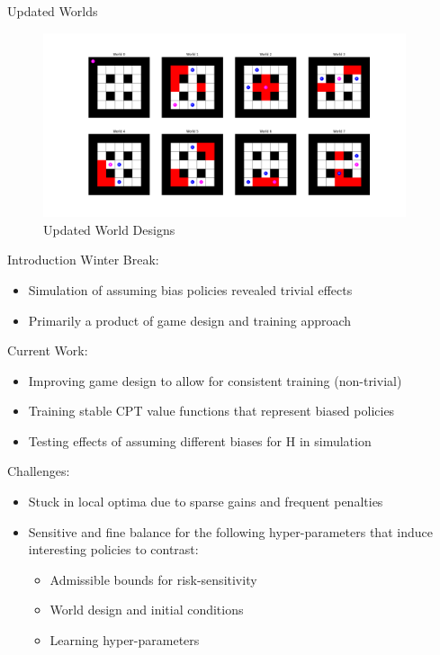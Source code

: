 \documentclass[aspectratio=1610, xcolor=dvipsnames]{packages/beamer}
\begin{document}
\begin{frame}{Updated Worlds}
    \begin{figure}
        \centering
        \includegraphics[width=0.95\textwidth]{../results/Fig_Worlds}
        \caption{Updated World Designs}
        \label{fig:Worlds}
    \end{figure}

\end{frame}
\begin{frame}{Introduction}
    Winter Break:
    \begin{itemize}
        \item Simulation of assuming bias policies revealed trivial effects
        \item Primarily a product of game design and training approach
    \end{itemize}
    Current Work:
    \begin{itemize}
        \item Improving game design to allow for consistent training (non-trivial)
        \item Training stable CPT value functions that represent biased policies
        \item Testing effects of assuming different biases for H in simulation
    \end{itemize}
    Challenges: \begin{itemize}
        \item Stuck in local optima due to sparse gains and frequent penalties
        \item Sensitive and fine balance for the following hyper-parameters that induce interesting policies to contrast:
        \begin{itemize}
            \item Admissible bounds for risk-sensitivity
            \item World design and initial conditions
            \item Learning hyper-parameters
        \end{itemize}
    \end{itemize}
\end{frame}
\end{document}
